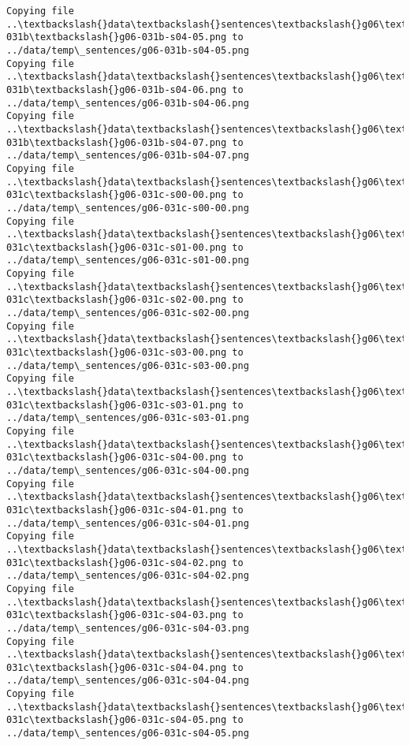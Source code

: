\documentclass[11pt]{article}
\begin{document}
\begin{Verbatim}[commandchars=\\\{\}]
Copying file ..\textbackslash{}data\textbackslash{}sentences\textbackslash{}g06\textbackslash{}g06-031b\textbackslash{}g06-031b-s04-05.png to
../data/temp\_sentences/g06-031b-s04-05.png
Copying file ..\textbackslash{}data\textbackslash{}sentences\textbackslash{}g06\textbackslash{}g06-031b\textbackslash{}g06-031b-s04-06.png to
../data/temp\_sentences/g06-031b-s04-06.png
Copying file ..\textbackslash{}data\textbackslash{}sentences\textbackslash{}g06\textbackslash{}g06-031b\textbackslash{}g06-031b-s04-07.png to
../data/temp\_sentences/g06-031b-s04-07.png
Copying file ..\textbackslash{}data\textbackslash{}sentences\textbackslash{}g06\textbackslash{}g06-031c\textbackslash{}g06-031c-s00-00.png to
../data/temp\_sentences/g06-031c-s00-00.png
Copying file ..\textbackslash{}data\textbackslash{}sentences\textbackslash{}g06\textbackslash{}g06-031c\textbackslash{}g06-031c-s01-00.png to
../data/temp\_sentences/g06-031c-s01-00.png
Copying file ..\textbackslash{}data\textbackslash{}sentences\textbackslash{}g06\textbackslash{}g06-031c\textbackslash{}g06-031c-s02-00.png to
../data/temp\_sentences/g06-031c-s02-00.png
Copying file ..\textbackslash{}data\textbackslash{}sentences\textbackslash{}g06\textbackslash{}g06-031c\textbackslash{}g06-031c-s03-00.png to
../data/temp\_sentences/g06-031c-s03-00.png
Copying file ..\textbackslash{}data\textbackslash{}sentences\textbackslash{}g06\textbackslash{}g06-031c\textbackslash{}g06-031c-s03-01.png to
../data/temp\_sentences/g06-031c-s03-01.png
Copying file ..\textbackslash{}data\textbackslash{}sentences\textbackslash{}g06\textbackslash{}g06-031c\textbackslash{}g06-031c-s04-00.png to
../data/temp\_sentences/g06-031c-s04-00.png
Copying file ..\textbackslash{}data\textbackslash{}sentences\textbackslash{}g06\textbackslash{}g06-031c\textbackslash{}g06-031c-s04-01.png to
../data/temp\_sentences/g06-031c-s04-01.png
Copying file ..\textbackslash{}data\textbackslash{}sentences\textbackslash{}g06\textbackslash{}g06-031c\textbackslash{}g06-031c-s04-02.png to
../data/temp\_sentences/g06-031c-s04-02.png
Copying file ..\textbackslash{}data\textbackslash{}sentences\textbackslash{}g06\textbackslash{}g06-031c\textbackslash{}g06-031c-s04-03.png to
../data/temp\_sentences/g06-031c-s04-03.png
Copying file ..\textbackslash{}data\textbackslash{}sentences\textbackslash{}g06\textbackslash{}g06-031c\textbackslash{}g06-031c-s04-04.png to
../data/temp\_sentences/g06-031c-s04-04.png
Copying file ..\textbackslash{}data\textbackslash{}sentences\textbackslash{}g06\textbackslash{}g06-031c\textbackslash{}g06-031c-s04-05.png to
../data/temp\_sentences/g06-031c-s04-05.png

\end{Verbatim}
\end{document}
